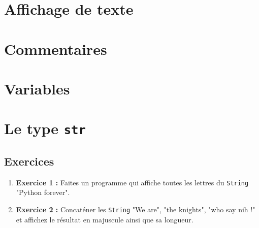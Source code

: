 \section{Affichage de texte}


\section{Commentaires}


\section{Variables}


\section{Le type \texttt{str}}


\subsection{Exercices}
\begin{enumerate}
    \item \textbf{Exercice 1 :} Faites un programme qui affiche toutes les lettres du \texttt{String} "Python forever".
    \item \textbf{Exercice 2 :} Concaténer les \texttt{String} "We are", "the knights", "who say nih !" et affichez le résultat en majuscule ainsi que sa longueur.
\end{enumerate}

